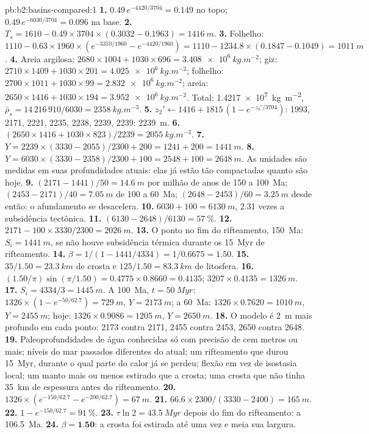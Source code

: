 \begin{solution}{pb:b2:basins-compared:1}
\textbf{1.} $0.49\,e^{-4420/3704} = 0.149$ no topo; $0.49\,e^{-6030/3704} = 0.096$ na base.
\textbf{2.} $T_s = 1610 - 0.49\times3704\times(0.3032 - 0.1963) = \qty{1416}{m}$.
\textbf{3.} Folhelho: $1110 - 0.63\times1960\times(e^{-3310/1960} - e^{-4420/1960}) = 1110 - 1234.8
\times(0.1847 - 0.1049) = \qty{1011}{m}$.
\textbf{4.} Areia argilosa: $2680\times1004 + 1030\times696 = \qty{3.408e6}{kg.m^{-2}}$; giz:
$2710\times1409 + 1030\times201 = \qty{4.025e6}{kg.m^{-2}}$; folhelho: $2700\times1011 + 1030\times99 =
\qty{2.832e6}{kg.m^{-2}}$; areia: $2650\times1416 + 1030\times194 = \qty{3.952e6}{kg.m^{-2}}$. Total:
\qty{1.4217e7}{kg.m^{-2}}, $\bar\rho_s = 14\,216\,910/6030 = \qty{2358}{kg.m^{-3}}$.
\textbf{5.} $z_2' \leftarrow 1416 + 1815\,(1 - e^{-z_2'/3704})$: 1993, 2171, 2221, 2235, 2238, 2239,
2239: \qty{2239}{m}.
\textbf{6.} $(2650\times1416 + 1030\times823)/2239 = \qty{2055}{kg.m^{-3}}$.
\textbf{7.} $Y = 2239\times(3330 - 2055)/2300 + 200 = 1241 + 200 = \qty{1441}{m}$.
\textbf{8.} $Y = 6030\times(3330 - 2358)/2300 + 100 = 2548 + 100 = \qty{2648}{m}$. As unidades são
medidas em suas profundidades atuais: elas já estão tão compactadas quanto são hoje.
\textbf{9.} $(2171 - 1441)/50 = \qty{14.6}{m}$ por milhão de anos de 150 a \qty{100}{Ma};
$(2453 - 2171)/40 = \qty{7.05}{m}$ de 100 a \qty{60}{Ma}; $(2648 - 2453)/60 = \qty{3.25}{m}$
desde então: o afundamento se desacelera.
\textbf{10.} $6030 + 100 = \qty{6130}{m}$, 2.31 vezes a subsidência tectônica.
\textbf{11.} $(6130 - 2648)/6130 = \qty{57}{\percent}$.
\textbf{12.} $2171 - 100\times3330/2300 = \qty{2026}{m}$.
\textbf{13.} O ponto no fim do rifteamento, \qty{150}{Ma}: $S_i = \qty{1441}{m}$, se não houve subsidência
térmica durante os \qty{15}{Myr} de rifteamento.
\textbf{14.} $\beta = 1/(1 - 1441/4334) = 1/0.6675 = 1.50$.
\textbf{15.} $35/1.50 = \qty{23.3}{km}$ de crosta e $125/1.50 = \qty{83.3}{km}$ de litosfera.
\textbf{16.} $(1.50/\pi)\sin(\pi/1.50) = 0.4775\times0.8660 = 0.4135$; $3207\times0.4135 =
\qty{1326}{m}$.
\textbf{17.} $S_i = 4334/3 = \qty{1445}{m}$. A \qty{100}{Ma}, $t = \qty{50}{Myr}$: $1326\times(1 -
e^{-50/62.7}) = \qty{729}{m}$, $Y = \qty{2173}{m}$; a \qty{60}{Ma}: $1326\times0.7620 =
\qty{1010}{m}$, $Y = \qty{2455}{m}$; hoje: $1326\times0.9086 = \qty{1205}{m}$, $Y = \qty{2650}{m}$.
\textbf{18.} O modelo é \qty{2}{m} mais profundo em cada ponto: 2173 contra 2171, 2455 contra 2453,
2650 contra 2648.
\textbf{19.} Paleoprofundidades de água conhecidas só com precisão de cem metros ou mais; níveis do mar passados
diferentes do atual; um rifteamento que durou \qty{15}{Myr}, durante o qual parte do calor já
se perdeu; flexão em vez de isostasia local; um manto mais ou menos estirado que a crosta;
uma crosta que não tinha \qty{35}{km} de espessura antes do rifteamento.
\textbf{20.} $1326\times(e^{-150/62.7} - e^{-200/62.7}) = \qty{67}{m}$.
\textbf{21.} $66.6\times2300/(3330 - 2400) = \qty{165}{m}$.
\textbf{22.} $1 - e^{-150/62.7} = \qty{91}{\percent}$.
\textbf{23.} $\tau\ln2 = \qty{43.5}{Myr}$ depois do fim do rifteamento: a \qty{106.5}{Ma}.
\textbf{24.} $\beta = \textbf{1.50}$: a crosta foi estirada até uma vez e meia sua largura.
\end{solution}
